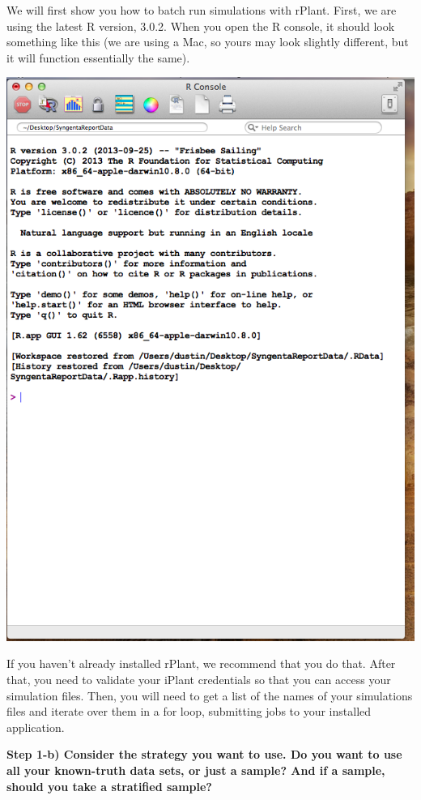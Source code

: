 \documentclass[twoside,a4paper]{refart}
\begin{document}
We will first show you how to batch run simulations with rPlant. First, we are using the latest R version, 3.0.2. When you open the R console, it should look something like this (we are using a Mac, so yours may look slightly different, but it will function essentially the same).
\begin{center}
	\includegraphics[width=\textwidth]{doc_step1_1}
\end{center}

If you haven't already installed rPlant, we recommend that you do that. After that, you need to validate your iPlant credentials so that you can access your simulation files. Then, you will need to get a list of the names of your simulations files and iterate over them in a for loop, submitting jobs to your installed application. 

\textbf{Step 1-b) Consider the strategy you want to use. Do you want to use all your known-truth data sets, or just a sample? And if a sample, should you take a stratified sample?}
\end{document}
